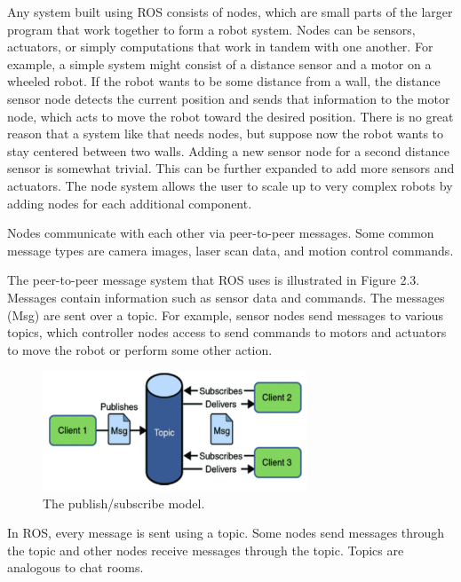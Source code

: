 \documentclass[twoside]{article}
\begin{document}
Any system built using ROS consists of nodes, which are small parts of the larger program that work together to form a robot system. Nodes can be sensors, actuators, or simply computations that work in tandem with one another. For example, a simple system might consist of a distance sensor and a motor on a wheeled robot. If the robot wants to be some distance from a wall, the distance sensor node detects the current position and sends that information to the motor node, which acts to move the robot toward the desired position. There is no great reason that a system like that needs nodes, but suppose now the robot wants to stay centered between two walls. Adding a new sensor node for a second distance sensor is somewhat trivial. This can be further expanded to add more sensors and actuators. The node system allows the user to scale up to very complex robots by adding nodes for each additional component.\\

\begin{frm-def}[Message]
Nodes communicate with each other via peer-to-peer messages. Some common message types are camera images, laser scan data, and motion control commands.
\end{frm-def}

The peer-to-peer message system that ROS uses is illustrated in Figure 2.3. Messages contain information such as sensor data and commands. The messages (Msg) are sent over a topic. For example, sensor nodes send messages to various topics, which controller nodes access to send commands to motors and actuators to move the robot or perform some other action.\\

\begin{figure}[ht]
\centering
\includegraphics[width=0.7\textwidth]{ChatRoom}
\caption{The publish/subscribe model.}
\end{figure}

\begin{frm-def}[Topic]
In ROS, every message is sent using a topic. Some nodes send messages through the topic and other nodes receive messages through the topic. Topics are analogous to chat rooms.
\end{frm-def}
\end{document}
